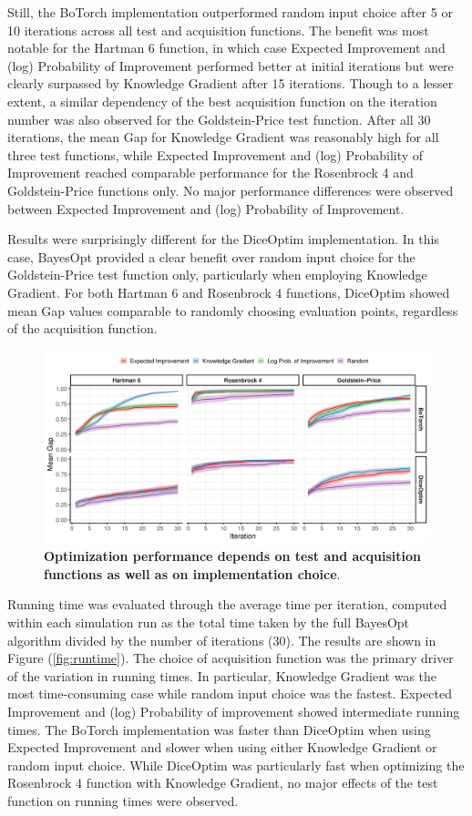 Still, the BoTorch implementation outperformed random input choice after 5 or 10 iterations across all test and acquisition functions. The benefit was most notable for the Hartman 6 function, in which case Expected Improvement and (log) Probability of Improvement performed better at initial iterations but were clearly surpassed by Knowledge Gradient after 15 iterations. Though to a lesser extent, a similar dependency of the best acquisition function on the iteration number was also observed for the Goldstein-Price test function. After all 30 iterations, the mean Gap for Knowledge Gradient was reasonably high for all three test functions, while Expected Improvement and (log) Probability of Improvement reached comparable performance for the Rosenbrock 4 and Goldstein-Price functions only. No major performance differences were observed between Expected Improvement and (log) Probability of Improvement.

Results were surprisingly different for the DiceOptim implementation. In this case, BayesOpt provided a clear benefit over random input choice for the Goldstein-Price test function only, particularly when employing Knowledge Gradient. For both Hartman 6 and Rosenbrock 4 functions, DiceOptim showed mean Gap values comparable to randomly choosing evaluation points, regardless of the acquisition function.

\begin{figure}[H]
\includegraphics[width=0.99\linewidth]{output/gap_results.png}
\caption{\small \textbf{Optimization performance depends on test and acquisition functions as well as on implementation choice}.}
\label{fig:gap}
\end{figure}

Running time was evaluated through the average time per iteration, computed within each simulation run as the total time taken by the full BayesOpt algorithm divided by the number of iterations (30). The results are shown in Figure (\ref{fig:runtime}). The choice of acquisition function was the primary driver of the variation in running times. In particular, Knowledge Gradient was the most time-consuming case while random input choice was the fastest. Expected Improvement and (log) Probability of improvement showed intermediate running times. The BoTorch implementation was faster than DiceOptim when using Expected Improvement and slower when using either Knowledge Gradient or random input choice. While DiceOptim was particularly fast when optimizing the Rosenbrock 4 function with Knowledge Gradient, no major effects of the test function on running times were observed.

